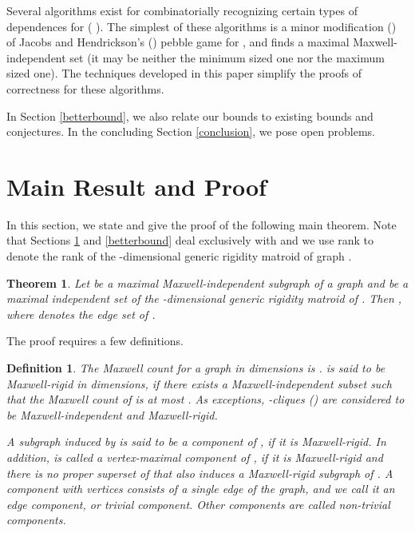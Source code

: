 \documentclass[10pt]{article}
\newtheorem{thm}{Theorem}
\newtheorem{dfn}{Definition}
\begin{document}
Several algorithms exist for combinatorially recognizing certain types of dependences for   (\cite{bib:survey, andrewThesis,sitharam:zhou:tractableADG:2004}
). The simplest of these algorithms is a
minor modification (\cite{andrewThesis}) of Jacobs and Hendrickson's (\cite{Jacobs97analgorithm}) pebble game for , and finds a maximal Maxwell-independent set (it may be neither the minimum sized one nor the 
maximum sized one). The techniques developed in this paper simplify the proofs of correctness for these algorithms.

\medskip

\medskip\noindent
In Section \ref{betterbound}, we also relate our bounds to existing bounds and conjectures.
In the concluding Section \ref{conclusion}, we pose open problems.






\section{Main Result and Proof}\label{sec:main}
In this section, we state and give the proof of the following main theorem. Note that Sections \ref{sec:main} and \ref{betterbound} deal exclusively with  and we use rank to denote the rank of the -dimensional generic rigidity matroid of graph .


\begin{thm}\label{thm:main}
Let  be a maximal Maxwell-independent subgraph of a graph  and  be a maximal independent set of the -dimensional generic
rigidity matroid of . Then , where  denotes the edge set of .
\end{thm}

\medskip
\noindent The proof requires a few definitions.


\begin{dfn}\label{dfn:Maxwell}
The {\em Maxwell count} for a graph  in  dimensions is .  is said to be \emph{Maxwell-rigid} in  dimensions, if there exists a Maxwell-independent subset  such that
the Maxwell count of  is at most . As exceptions, -cliques  () are considered to be Maxwell-independent and Maxwell-rigid.

A subgraph  induced by  is
said to be a {\em component} of , if it is Maxwell-rigid. In addition,  is called a {\em vertex-maximal component} of , if it is Maxwell-rigid and there is no proper superset of  that also induces a Maxwell-rigid subgraph of . A component with  vertices consists of a single edge of the graph, and we call it an {\em edge component}, or {\em trivial} component. Other components are called {\em non-trivial} components.
\end{dfn}
\end{document}
